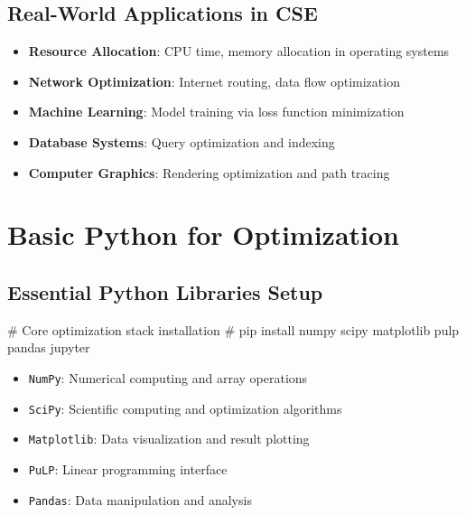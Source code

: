 \documentclass[
  letterpaper,
  DIV=11,
  numbers=noendperiod]{scrreprt}
\newenvironment{Shaded}{\begin{snugshade}}{\end{snugshade}}
\newcommand{\CommentTok}[1]{\textcolor[rgb]{0.37,0.37,0.37}{#1}}
\providecommand{\tightlist}{%
  \setlength{\itemsep}{0pt}\setlength{\parskip}{0pt}}
\begin{document}
\subsection{Real-World Applications in
CSE}\label{real-world-applications-in-cse}

\begin{itemize}
\tightlist
\item
  \textbf{Resource Allocation}: CPU time, memory allocation in operating
  systems
\item
  \textbf{Network Optimization}: Internet routing, data flow
  optimization
\item
  \textbf{Machine Learning}: Model training via loss function
  minimization
\item
  \textbf{Database Systems}: Query optimization and indexing
\item
  \textbf{Computer Graphics}: Rendering optimization and path tracing
\end{itemize}

\section{Basic Python for
Optimization}\label{basic-python-for-optimization}

\subsection{Essential Python Libraries
Setup}\label{essential-python-libraries-setup}

\begin{Shaded}
\begin{Highlighting}[]
\CommentTok{\# Core optimization stack installation}
\CommentTok{\# pip install numpy scipy matplotlib pulp pandas jupyter}
\end{Highlighting}
\end{Shaded}

\begin{tcolorbox}[enhanced jigsaw, leftrule=.75mm, rightrule=.15mm, colback=white, colbacktitle=quarto-callout-tip-color!10!white, arc=.35mm, opacityback=0, toptitle=1mm, bottomrule=.15mm, bottomtitle=1mm, titlerule=0mm, title=\textcolor{quarto-callout-tip-color}{\faLightbulb}\hspace{0.5em}{Key \texttt{Python} Libraries Required for Computational Part}, toprule=.15mm, left=2mm, coltitle=black, breakable, colframe=quarto-callout-tip-color-frame, opacitybacktitle=0.6]

\begin{itemize}
\item
  \texttt{NumPy}: Numerical computing and array operations
\item
  \texttt{SciPy}: Scientific computing and optimization algorithms
\item
  \texttt{Matplotlib}: Data visualization and result plotting
\item
  \texttt{PuLP}: Linear programming interface
\item
  \texttt{Pandas}: Data manipulation and analysis
\end{itemize}

\end{tcolorbox}
\end{document}
